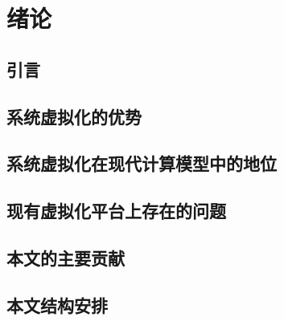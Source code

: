
\chapter{绪论}
\label{chap:what}

\section{引言}

\section{系统虚拟化的优势}

\section{系统虚拟化在现代计算模型中的地位}

\section{现有虚拟化平台上存在的问题}

\section{本文的主要贡献}

\section{本文结构安排}



